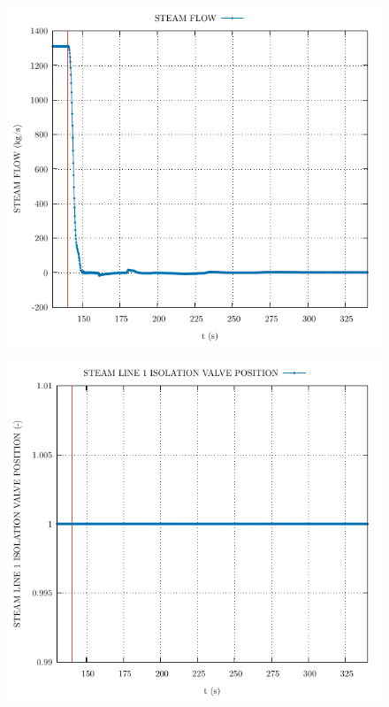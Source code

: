 \documentclass{article}
\begin{document}
\begin{multicols}{2}
\begin{figure}[H]
\end{figure}
\begin{figure}[H]
\centering
\includegraphics[width=\linewidth]{./graphs/STEAM FLOW_comp.pdf}
\end{figure}
\begin{figure}[H]
\centering
\includegraphics[width=\linewidth]{./graphs/STEAM LINE 1 ISOLATION VALVE POSITION_comp.pdf}

\end{figure}
\end{multicols}
\end{document}
